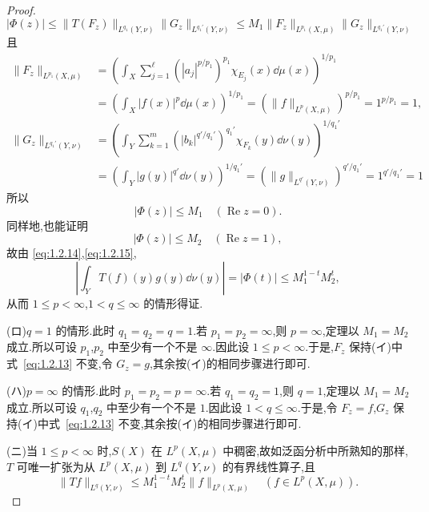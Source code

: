 \begin{proof}
\begin{equation*}
|\Phi(z)| \leq \| T(F_{z}) \|_{L^{q_{1}}(Y, \nu)}\| G_{z} \|_{L^{q_{1}'}(Y, \nu)} \leq M_{1}\| F_{z} \|_{L^{p_{1}}(X, \mu)}\| G_{z} \|_{L^{q_{1}'}(Y, \nu)}
\end{equation*}
且
\begin{align*}
\| F_{z} \|_{L^{p_{1}}(X, \mu)} &= \left(\int_{X}\sum_{j=1}^{\ell}\left(|a_{j}|^{p/p_{1}}\right)^{p_{1}}\chi_{E_{j}}(x)\dd \mu(x)\right)^{1/p_{1}} \\
&= \left(\int_{X}|f(x)|^{p}\dd \mu(x)\right)^{1/p_{1}} = \left(\| f \|_{L^{p}(X, \mu)}\right)^{p/p_{1}} = 1^{p/p_{1}} = 1,
\end{align*}
\begin{align*}
\| G_{z} \|_{L^{q_{1}'}(Y, \nu)} & = \left(\int_{Y}\sum_{k=1}^{m}\left(|b_{k}|^{q'/q_{1}'}\right)^{q_{1}'}\chi_{F_{k}}(y)\dd \nu(y)\right)^{1/q_{1}'} \\
& = \left(\int_{Y}|g(y)|^{q'}\dd \nu(y)\right)^{1/q_{1}'} = \left(\| g \|_{L^{q'}(Y, \nu)}\right)^{q'/q_{1}'} = 1^{q'/q_{1}'} = 1
\end{align*}
所以
\begin{equation*}
|\Phi(z)| \leq M_{1} \quad (\operatorname{Re} z = 0).
\end{equation*}
同样地,也能证明
\begin{equation*}
|\Phi(z)| \leq M_{2} \quad (\operatorname{Re} z = 1),
\end{equation*}
故由 \eqref{eq:1.2.14},\eqref{eq:1.2.15},
\begin{equation*}
\left|\int_{Y} T(f)(y)g(y)\dd \nu(y)\right| = |\Phi(t)| \leq M_{1}^{1-t}M_{2}^{t},
\end{equation*}
从而 $1 \leq p < \infty$,$1 < q \leq \infty$ 的情形得证.

(ロ)$q = 1$ 的情形.此时 $q_{1} = q_{2} = q = 1$.若 $p_{1} = p_{2} = \infty$,则 $p = \infty$,定理以 $M_{1} = M_{2}$ 成立.所以可设 $p_{1}$,$p_{2}$ 中至少有一个不是 $\infty$.因此设 $1 \leq p < \infty$.于是,$F_{z}$ 保持(イ)中式~\eqref{eq:1.2.13} 不变,令 $G_{z} = g$,其余按(イ)的相同步骤进行即可.

(ハ)$p = \infty$ 的情形.此时 $p_{1} = p_{2} = p = \infty$.若 $q_{1} = q_{2} = 1$,则 $q = 1$,定理以 $M_{1} = M_{2}$ 成立.所以可设 $q_{1}$,$q_{2}$ 中至少有一个不是 $1$.因此设 $1 < q \leq \infty$.于是,令 $F_{z} = f$,$G_{z}$ 保持(イ)中式~\eqref{eq:1.2.13} 不变,其余按(イ)的相同步骤进行即可.

(ニ)当 $1 \leq p < \infty$ 时,$S(X)$ 在 $L^{p}(X, \mu)$ 中稠密,故如泛函分析中所熟知的那样,$T$ 可唯一扩张为从 $L^{p}(X, \mu)$ 到 $L^{q}(Y, \nu)$ 的有界线性算子,且
\begin{equation*}
\| Tf \|_{L^{q}(Y, \nu)} \leq M_{1}^{1-t}M_{2}^{t}\| f \|_{L^{p}(X, \mu)} \quad (f \in L^{p}(X, \mu)).
\end{equation*}
\end{proof}

